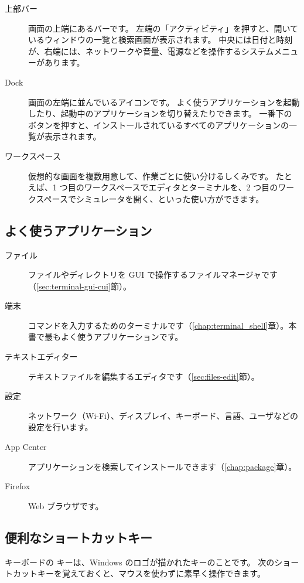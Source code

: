 \begin{description}
  \item[上部バー]
    画面の上端にあるバーです。
    左端の「アクティビティ」を押すと、開いているウィンドウの一覧と検索画面が表示されます。
    中央には日付と時刻が、右端には、ネットワークや音量、電源などを操作するシステムメニューがあります。
  \item[Dock]
    画面の左端に並んでいるアイコンです。
    よく使うアプリケーションを起動したり、起動中のアプリケーションを切り替えたりできます。
    一番下のボタンを押すと、インストールされているすべてのアプリケーションの一覧が表示されます。
  \item[ワークスペース]
    仮想的な画面を複数用意して、作業ごとに使い分けるしくみです。
    たとえば、1 つ目のワークスペースでエディタとターミナルを、2 つ目のワークスペースでシミュレータを開く、といった使い方ができます。
\end{description}

\subsection{よく使うアプリケーション}

\begin{description}
  \item[ファイル] ファイルやディレクトリを GUI で操作するファイルマネージャです（\ref{sec:terminal-gui-cui}節）。
  \item[端末] コマンドを入力するためのターミナルです（\ref{chap:terminal_shell}章）。本書で最もよく使うアプリケーションです。
  \item[テキストエディター] テキストファイルを編集するエディタです（\ref{sec:files-edit}節）。
  \item[設定] ネットワーク（Wi-Fi）、ディスプレイ、キーボード、言語、ユーザなどの設定を行います。
  \item[App Center] アプリケーションを検索してインストールできます（\ref{chap:package}章）。
  \item[Firefox] Web ブラウザです。
\end{description}

\subsection{便利なショートカットキー}

キーボードの  キーは、Windows のロゴが描かれたキーのことです。
次のショートカットキーを覚えておくと、マウスを使わずに素早く操作できます。

